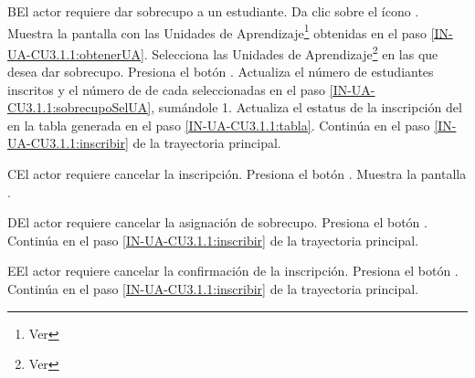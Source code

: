 \begin{UCtrayectoriaA}{B}{El actor requiere dar sobrecupo a un estudiante.}
	\UCpaso[\UCactor]  \label{IN-UA-CU3.1.1:sobrecupo}Da clic sobre el ícono \IUContenido.
	\UCpaso Muestra la pantalla  con las Unidades de Aprendizaje\footnote{Ver } obtenidas en el paso \ref{IN-UA-CU3.1.1:obtenerUA}.
	\UCpaso[\UCactor]  \label{IN-UA-CU3.1.1:sobrecupoSelUA}Selecciona las Unidades de Aprendizaje\footnote{Ver } en las que desea dar sobrecupo.
	\UCpaso[\UCactor] Presiona el botón .
	\UCpaso Actualiza el número de estudiantes inscritos y el número de  de cada  seleccionadas en el paso \ref{IN-UA-CU3.1.1:sobrecupoSelUA}, sumándole 1.
	\UCpaso Actualiza el estatus de la inscripción del  en la tabla generada en el paso \ref{IN-UA-CU3.1.1:tabla}.
	\UCpaso Continúa en el paso \ref{IN-UA-CU3.1.1:inscribir}  de la trayectoria principal.
\end{UCtrayectoriaA}

\begin{UCtrayectoriaA}{C}{El actor requiere cancelar la inscripción.}
	\UCpaso[\UCactor] Presiona el botón .
	\UCpaso Muestra la pantalla .
\end{UCtrayectoriaA}

\begin{UCtrayectoriaA}{D}{El actor requiere cancelar la asignación de sobrecupo.}
	\UCpaso[\UCactor] Presiona el botón .
	\UCpaso Continúa en el paso \ref{IN-UA-CU3.1.1:inscribir} de la trayectoria principal.
\end{UCtrayectoriaA}

\begin{UCtrayectoriaA}{E}{El actor requiere cancelar la confirmación de la inscripción.}
	\UCpaso[\UCactor] Presiona el botón .
	\UCpaso Continúa en el paso \ref{IN-UA-CU3.1.1:inscribir} de la trayectoria principal.
\end{UCtrayectoriaA}

